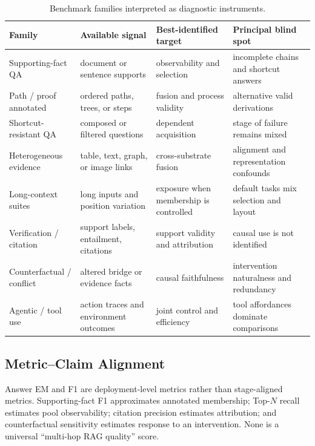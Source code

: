 \documentclass[manuscript,review]{acmart}
\theoremstyle{definition}
\theoremstyle{plain}
\theoremstyle{remark}
\begin{document}
\begin{table}[t]
\caption{Benchmark families interpreted as diagnostic instruments.}
\label{tab:benchmark_families_extended}
\centering
\scriptsize
\begin{tabularx}{\linewidth}{@{}p{2.5cm}p{2.8cm}p{2.3cm}Y@{}}
\toprule
Family & Available signal & Best-identified target & Principal blind spot \\
\midrule
Supporting-fact QA & document or sentence supports & observability and selection & incomplete chains and shortcut answers \\
Path / proof annotated & ordered paths, trees, or steps & fusion and process validity & alternative valid derivations \\
Shortcut-resistant QA & composed or filtered questions & dependent acquisition & stage of failure remains mixed \\
Heterogeneous evidence & table, text, graph, or image links & cross-substrate fusion & alignment and representation confounds \\
Long-context suites & long inputs and position variation & exposure when membership is controlled & default tasks mix selection and layout \\
Verification / citation & support labels, entailment, citations & support validity and attribution & causal use is not identified \\
Counterfactual / conflict & altered bridge or evidence facts & causal faithfulness & intervention naturalness and redundancy \\
Agentic / tool use & action traces and environment outcomes & joint control and efficiency & tool affordances dominate comparisons \\
\bottomrule
\end{tabularx}
\end{table}

\subsection{Metric--Claim Alignment}
\label{subsec:metric_alignment}

Answer EM and F1 are deployment-level metrics rather than stage-aligned
metrics.
Supporting-fact F1 approximates annotated membership; Top-$N$ recall estimates
pool observability; citation precision estimates attribution; and
counterfactual sensitivity estimates response to an intervention. None is a
universal ``multi-hop RAG quality'' score.
\end{document}
